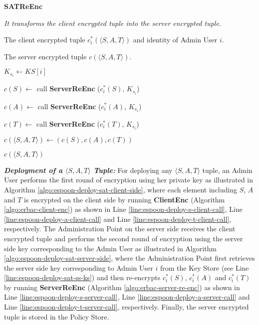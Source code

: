\documentclass[epsfig,a4paper,11pt,titlepage]{book}
\numberwithin{algorithm}{chapter}
\newcommand{\algofontsize}{\fontsize{11}{12}\selectfont}
\begin{document}
\begin{algorithm} [htp]
{\algofontsize
\caption{\textbf{SATReEnc}}

\label{algo:espoon-deploy-sat-server-side}

\begin{algorithmic}[1]

\INPUT \emph{It transforms the client encrypted tuple into the server encrypted tuple.}

\Require The client encrypted tuple $c^*_i (\langle S, A, T \rangle)$ and identity of Admin User $i$.

\Ensure The server encrypted tuple $c (\langle S, A, T \rangle)$.

\medskip

\State $K_{s_i} \leftarrow KS[i]$ {\algofontsize {}} \label{line:espoon-deploy-sat-ss-ks}

\State $c(S) \leftarrow$ call \textbf{ServerReEnc} ($c^*_i (S)$, $K_{s_i}$) \label{line:espoon-deploy-s-server-call}

\State $c(A) \leftarrow$ call \textbf{ServerReEnc} ($c^*_i (A)$, $K_{s_i}$) \label{line:espoon-deploy-a-server-call}

\State $c(T) \leftarrow$ call \textbf{ServerReEnc} ($c^*_i (T)$, $K_{s_i}$) \label{line:espoon-deploy-t-server-call}

\State $c (\langle S, A, T \rangle) \leftarrow (c (S), c (A), c (T))$ \label{line:espoon-deploy-sat-server-assignment}

\Return $c (\langle S, A, T \rangle)$

\end{algorithmic}
}
\end{algorithm}

\noindent \emph{\textbf{Deployment of a $\langle S, A, T \rangle$ Tuple:}}
For deploying any $\langle S, A, T \rangle$ tuple, an Admin User performs the first round of encryption using her private key as illustrated in Algorithm \ref{algo:espoon-deploy-sat-client-side}, where each element including $S$, $A$ and $T$ is encrypted on the client side by running \textbf{ClientEnc} (Algorithm \ref{algo:erbac-client-enc}) as shown in Line \ref{line:espoon-deploy-s-client-call}, Line \ref{line:espoon-deploy-a-client-call} and Line \ref{line:espoon-deploy-t-client-call}, respectively. The Administration Point on the server side receives the client encrypted tuple and performs the second round of encryption using the server side key corresponding to the Admin User as illustrated in Algorithm \ref{algo:espoon-deploy-sat-server-side}, where the Administration Point first retrieves the server side key corresponding to Admin User $i$ from the Key Store (see Line \ref{line:espoon-deploy-sat-ss-ks}) and then re-encrypts $c^*_i (S)$, $c^*_i (A)$ and $c^*_i (T)$ by running \textbf{ServerReEnc} (Algorithm \ref{algo:erbac-server-re-enc}) as shown in Line \ref{line:espoon-deploy-s-server-call}, Line \ref{line:espoon-deploy-a-server-call} and Line \ref{line:espoon-deploy-t-server-call}, respectively. Finally, the server encrypted tuple is stored in the Policy Store.
\end{document}
